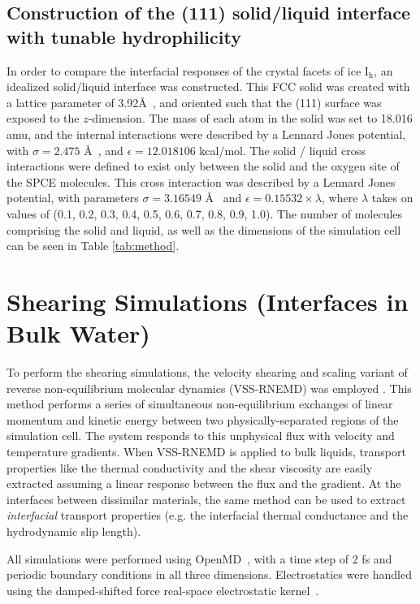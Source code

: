 \documentclass[aps,jcp,preprint,showpacs,superscriptaddress,groupedaddress]{revtex4}  %
\begin{document}
\subsection{Construction of the (111) solid/liquid interface with tunable hydrophilicity}
In order to compare the interfacial responses of the crystal facets of 
ice I$_\mathrm{h}$, an idealized solid/liquid interface was constructed.
This FCC solid was created with a lattice parameter of 3.92\AA~, and oriented
such that the (111) surface was exposed to the $z$-dimension. The mass of 
each atom in the solid was set to 18.016 amu, and the internal 
interactions were described by a Lennard Jones potential, with 
$\sigma = 2.475$ \AA~, and $\epsilon = 12.018106$ kcal/mol. The solid / liquid
cross interactions were defined to exist only between the solid and the 
oxygen site of the SPCE molecules. This cross interaction was described by
a Lennard Jones potential, with parameters $\sigma = 3.16549$ \AA~ and 
$\epsilon = 0.15532 \times \lambda$, where $\lambda$ takes on values of
(0.1, 0.2, 0.3, 0.4, 0.5, 0.6, 0.7, 0.8, 0.9, 1.0). The number of molecules 
comprising the
solid and liquid, as well as the dimensions of the simulation cell
can be seen in Table \ref{tab:method}.


\section{Shearing Simulations (Interfaces in Bulk Water)}
To perform the shearing simulations, the velocity shearing and scaling
variant of reverse non-equilibrium molecular dynamics (VSS-RNEMD) was
employed \cite{Kuang12}. This method performs a series of simultaneous
non-equilibrium exchanges of linear momentum and kinetic energy
between two physically-separated regions of the simulation cell.  The
system responds to this unphysical flux with velocity and temperature
gradients.  When VSS-RNEMD is applied to bulk liquids, transport
properties like the thermal conductivity and the shear viscosity are
easily extracted assuming a linear response between the flux and the
gradient.  At the interfaces between dissimilar materials, the same
method can be used to extract \textit{interfacial} transport
properties (e.g. the interfacial thermal conductance and the
hydrodynamic slip length).

All simulations were performed using OpenMD~\cite{OOPSE,openmd}, with
a time step of 2 fs and periodic boundary conditions in all three
dimensions.  Electrostatics were handled using the damped-shifted
force real-space electrostatic kernel~\cite{Ewald}.
\end{document}

